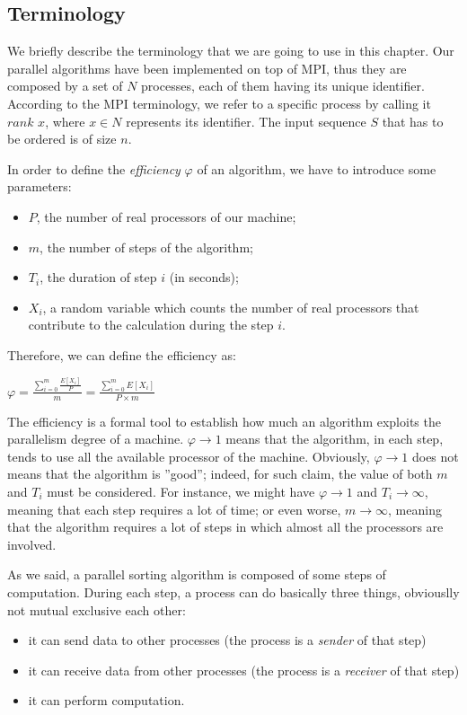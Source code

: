 \subsection*{Terminology}
We briefly describe the terminology that we are going to use in this chapter. Our parallel algorithms have been implemented on top of MPI, thus they are composed by a set of $N$ processes, each of them having its unique identifier. According to the MPI terminology, we refer to a specific process by calling it $rank$ $x$, where $x \in N$ represents its identifier. The input sequence $S$ that has to be ordered is of size $n$. 

In order to define the \textit{efficiency} $\varphi$ of an algorithm, we have to introduce some parameters:
\begin{itemize}
\item $P$, the number of real processors of our machine; 
\item $m$, the number of steps of the algorithm;
\item $T_i$, the duration of step $i$ (in seconds);
\item $X_i$, a random variable which counts the number of real processors that contribute to the calculation during the step $i$.
\end{itemize}
Therefore, we can define the efficiency as:
\begin{center}
$\varphi = \frac{\sum_{i=0}^m \frac{E[X_i]}{P}}{m} = \frac{\sum_{i=0}^m E[X_i]}{P \times m} $
\end{center}
The efficiency is a formal tool to establish how much an algorithm exploits the parallelism degree of a machine. $\varphi \rightarrow 1$ means that the algorithm, in each step, tends to use all the available processor of the machine. Obviously, $\varphi \rightarrow 1$ does not means that the algorithm is ''good''; indeed, for such claim, the value of both $m$ and $T_i$ must be considered. For instance, we might have $\varphi \rightarrow 1$ and $T_i \rightarrow\infty$, meaning that each step requires a lot of time; or even worse, $m \rightarrow\infty$, meaning that the algorithm requires a lot of steps in which almost all the processors are involved.

As we said, a parallel sorting algorithm is composed of some steps of computation. During each step, a process can do basically three things, obviouslly not mutual exclusive each other:
\begin{itemize}
\item it can send data to other processes (the process is a \textit{sender} of that step)
\item it can receive data from other processes (the process is a \textit{receiver} of that step)
\item it can perform computation.
\end{itemize}
